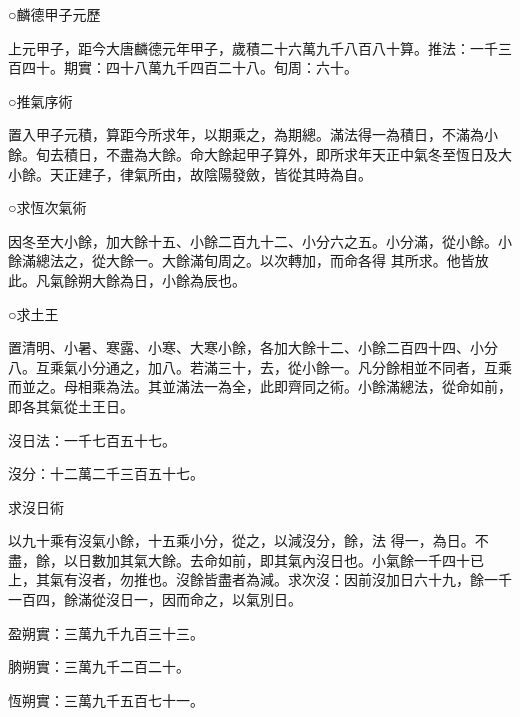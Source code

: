 
\begin{pinyinscope}

 ○麟德甲子元歷



 上元甲子，距今大唐麟德元年甲子，歲積二十六萬九千八百八十算。推法：一千三百四十。期實：四十八萬九千四百二十八。旬周：六十。



 ○推氣序術



 置入甲子元積，算距今所求年，以期乘之，為期總。滿法得一為積日，不滿為小餘。旬去積日，不盡為大餘。命大餘起甲子算外，即所求年天正中氣冬至恆日及大小餘。天正建子，律氣所由，故陰陽發斂，皆從其時為自。



 ○求恆次氣術



 因冬至大小餘，加大餘十五、小餘二百九十二、小分六之五。小分滿，從小餘。小餘滿總法之，從大餘一。大餘滿旬周之。以次轉加，而命各得
 其所求。他皆放此。凡氣餘朔大餘為日，小餘為辰也。



 ○求土王



 置清明、小暑、寒露、小寒、大寒小餘，各加大餘十二、小餘二百四十四、小分八。互乘氣小分通之，加八。若滿三十，去，從小餘一。凡分餘相並不同者，互乘而並之。母相乘為法。其並滿法一為全，此即齊同之術。小餘滿總法，從命如前，即各其氣從土王日。



 沒日法：一千七百五十七。



 沒分：十二萬二千三百五十七。



 求沒日術



 以九十乘有沒氣小餘，十五乘小分，從之，以減沒分，餘，法
 得一，為日。不盡，餘，以日數加其氣大餘。去命如前，即其氣內沒日也。小氣餘一千四十已
 上，其氣有沒者，勿推也。沒餘皆盡者為減。求次沒：因前沒加日六十九，餘一千一百四，餘滿從沒日一，因而命之，以氣別日。



 盈朔實：三萬九千九百三十三。



 朒朔實：三萬九千二百二十。



 恆朔實：三萬九千五百七十一。




\end{pinyinscope}
